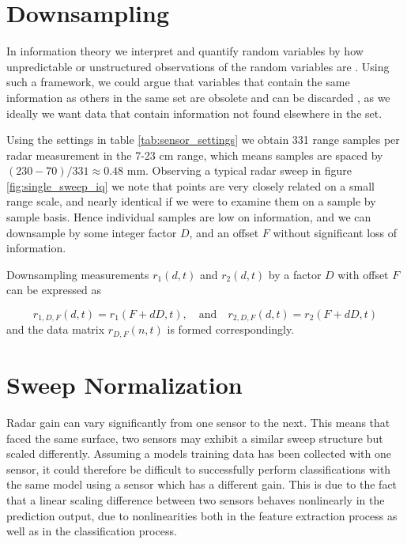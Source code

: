 \section{Downsampling}
\label{downsampling}

In information theory we interpret and quantify random variables by how unpredictable or unstructured observations of the random variables are \citep{anderson_johnnesson_2006}. Using such a framework, we could argue that variables that contain the same information as others in the same set are obsolete and can be discarded \citep{hyvasrinen_karhunen_oja_2004}, as we ideally we want data that contain information not found elsewhere in the set. 

Using the settings in table \ref{tab:sensor_settings} we obtain 331 range samples per radar measurement in the 7-23 cm range, which means samples are spaced by $(230-70)/331\approx0.48$ mm. Observing a typical radar sweep in figure \ref{fig:single_sweep_iq} we note that points are very closely related on a small range scale, and nearly identical if we were to examine them on a sample by sample basis. Hence individual samples are low on information, and we can downsample by some integer factor $D$, and an offset $F$ without significant loss of information.

Downsampling measurements $r_1(d,t)$ and $r_2(d,t)$ by a factor $D$ with offset $F$ can be expressed as

\begin{equation}
	r_{1,D, F}(d, t) = r_{1}(F+dD,t), 
	\quad \text{and} \quad r_{2,D,F}(d,t) = r_{2}(F+dD,t)
\end{equation}
and the data matrix $r_{D,F}(n,t)$ is formed correspondingly.

\section{Sweep Normalization}

Radar gain can vary significantly from one sensor to the next. This means that faced the same surface, two sensors may exhibit a similar sweep structure but scaled differently. Assuming a models training data has been collected with one sensor, it could therefore be difficult to successfully perform classifications with the same model using a sensor which has a different gain. This is due to the fact that a linear scaling difference between two sensors behaves nonlinearly in the prediction output, due to nonlinearities both in the feature extraction process as well as in the classification process.

